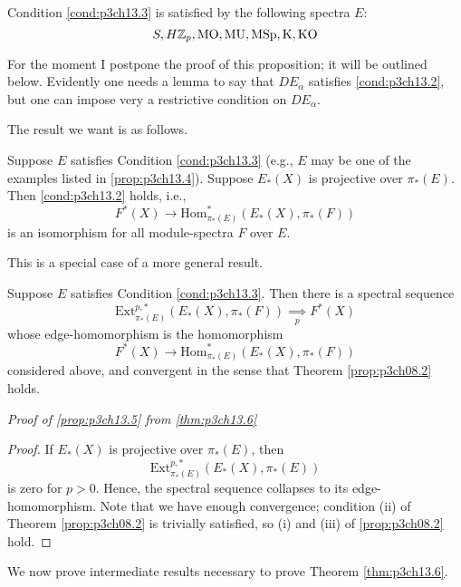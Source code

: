 \documentclass[../main]{subfiles}
\begin{document}
\begin{proposition}\label{prop:p3ch13.4}
Condition \ref{cond:p3ch13.3} is satisfied by the following spectra $E$:
\[S, H\mathbb{Z}_p, \mathrm{MO, MU, MSp, K, KO}\]
\end{proposition}
For the moment I postpone the proof of this proposition; it will be outlined below. Evidently one needs a lemma to say that $DE_\alpha$ satisfies \ref{cond:p3ch13.2}, but one can impose very a restrictive condition on $DE_\alpha$.

The result we want is as follows.
\begin{proposition}\label{prop:p3ch13.5} Suppose $E$ satisfies Condition \ref{cond:p3ch13.3} (e.g., $E$ may be one of the examples listed in \ref{prop:p3ch13.4}). Suppose $E_\ast(X)$ is projective over $\pi_\ast(E)$. Then \ref{cond:p3ch13.2} holds, i.e.,
\[F^\ast(X) \longrightarrow \text{Hom}^\ast_{\pi_\ast(E)}(E_\ast(X), \pi_\ast(F))\]
is an isomorphism for all module-spectra $F$ over $E$.
\end{proposition}
This is a special case of a more general result.
\begin{theorem}\label{thm:p3ch13.6}
Suppose $E$ satisfies Condition \ref{cond:p3ch13.3}. Then there is a spectral sequence
\[
\text{Ext}^{p, \ast}_{\pi_\ast(E)}(E_\ast(X), \pi_\ast(F)) \underset{p}{\implies}F^{\ast}(X)
\]
whose edge-homomorphism is the homomorphism
\[F^\ast(X) \longrightarrow \text{Hom}^\ast_{\pi_\ast(E)}(E_\ast(X), \pi_\ast(F))\]
considered above, and convergent in the sense that Theorem \ref{prop:p3ch08.2} holds.
\end{theorem}
\emph{Proof of \ref{prop:p3ch13.5} from \ref{thm:p3ch13.6}} \begin{proof} If $E_\ast(X)$ is projective over $\pi_\ast(E)$, then 
\[
\text{Ext}^{p, \ast}_{\pi_\ast(E)}(E_\ast(X),\pi_\ast(E))
\]
is zero for $p > 0$. Hence, the spectral sequence collapses to its edge-homomorphism. Note that we have enough convergence; condition (ii) of Theorem \ref{prop:p3ch08.2} is trivially satisfied, so (i) and (iii) of \ref{prop:p3ch08.2} hold.
\end{proof}
We now prove intermediate results necessary to prove Theorem \ref{thm:p3ch13.6}.
\end{document}
